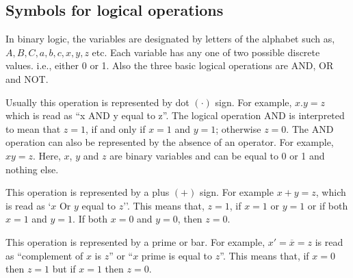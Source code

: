 \subsection{Symbols for logical operations}\label{sec5.11.1}

In binary logic, the variables are designated by letters of the alphabet such as, $A, B, C, a, b, c, x, y, z$ etc. Each variable has any one of two possible discrete values. i.e., either 0 or 1. Also the three basic logical operations are AND, OR and NOT.

 Usually this operation is represented by dot $(\cdot)$ sign. For example, $x.y=z$ which is read as ``x AND y equal to z''. The logical operation AND is interpreted to mean that $z=1$, if and only if $x=1$ and $y=1$; otherwise $z=0$. The AND operation can also be represented by the absence of an operator. For example, $xy=z$. Here, $x$, $y$ and $z$ are binary variables and can be equal to 0 or 1 and nothing else.

 This operation is represented by a plus $(+)$ sign. For example $x+y=z$, which is read as `$x$ Or $y$ equal to $z$''. This means that, $z=1$, if $x=1$ or $y=1$ or if both $x=1$ and $y=1$. If both $x=0$ and $y=0$, then $z=0$.

 This operation is represented by a prime or bar. For example, $x'=\overline{x}=z$ is read as ``complement of $x$ is $z$'' or ``$x$ prime is equal to $z$''. This means that, if $x=0$ then $z=1$ but if $x=1$ then $z=0$.

